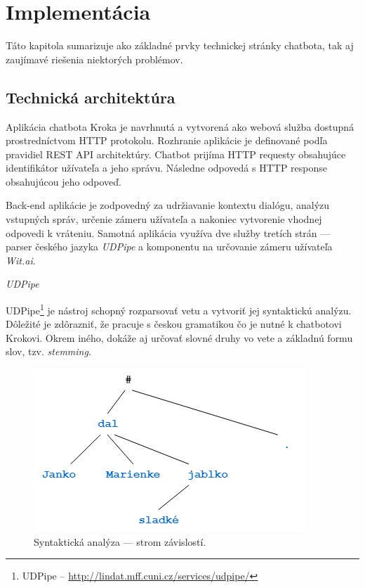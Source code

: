 \documentclass{ExcelAtFIT}
\begin{document}
\section{Implementácia}
Táto kapitola sumarizuje ako základné prvky technickej stránky chatbota, tak aj zaujímavé riešenia niektorých problémov.

\subsection{Technická architektúra}
Aplikácia chatbota Kroka je navrhnutá a vytvorená ako webová služba dostupná prostredníctvom HTTP protokolu. Rozhranie aplikácie je definované podľa pravidiel REST API architektúry. Chatbot prijíma HTTP requesty obsahujúce identifikátor užívateľa a jeho správu. Následne odpovedá s HTTP response obsahujúcou jeho odpoveď.

Back-end aplikácie je zodpovedný za udržiavanie kontextu dialógu, analýzu vstupných správ, určenie zámeru užívateľa a nakoniec vytvorenie vhodnej odpovedi k vráteniu.
Samotná aplikácia využíva dve služby tretích strán --- parser českého jazyka \emph{UDPipe} a komponentu na určovanie zámeru užívateľa \emph{Wit.ai}.

\newpage
\textit{UDPipe}

\noindent UDPipe\footnote{UDPipe -- \url{http://lindat.mff.cuni.cz/services/udpipe/}} je nástroj schopný rozparsovať vetu a vytvoriť jej syntaktickú analýzu. Dôležité je zdôrazniť, že pracuje s českou gramatikou čo je nutné k chatbotovi Krokovi. Okrem iného, dokáže aj určovať slovné druhy vo vete a základnú formu slov, tzv. \emph{stemming}.

\begin{figure}[h]
	\centering
	\includegraphics[width=1\linewidth]{DependencyTree.png}
	\caption{Syntaktická analýza --- strom závislostí.}
	\label{tree}
\end{figure}
\end{document}

